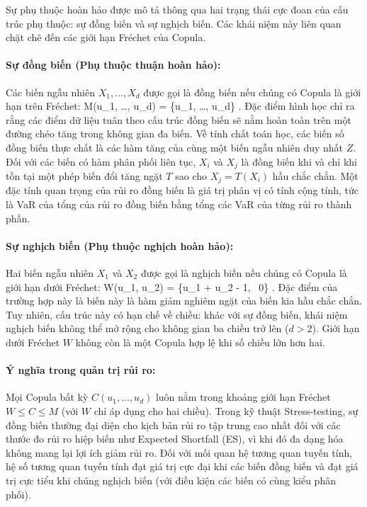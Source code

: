 Sự phụ thuộc hoàn hảo được mô tả thông qua hai trạng thái cực đoan của cấu trúc phụ thuộc: sự đồng biến và sự nghịch biến. Các khái niệm này liên quan chặt chẽ đến các giới hạn Fréchet của Copula.

\paragraph{Sự đồng biến (Phụ thuộc thuận hoàn hảo):}
Các biến ngẫu nhiên $X_1, \dots, X_d$ được gọi là đồng biến nếu chúng có Copula là giới hạn trên Fréchet:
\bea
M(u_1, \dots, u_d) = \min\{u_1, \dots, u_d\} .
\eea
Đặc điểm hình học chỉ ra rằng các điểm dữ liệu tuân theo cấu trúc đồng biến sẽ nằm hoàn toàn trên một đường chéo tăng trong không gian đa biến. Về tính chất toán học, các biến số đồng biến thực chất là các hàm tăng của cùng một biến ngẫu nhiên duy nhất $Z$. Đối với các biến có hàm phân phối liên tục, $X_i$ và $X_j$ là đồng biến khi và chỉ khi tồn tại một phép biến đổi tăng ngặt $T$ sao cho $X_j = T(X_i)$ hầu chắc chắn. Một đặc tính quan trọng của rủi ro đồng biến là giá trị phân vị có tính cộng tính, tức là VaR của tổng của rủi ro đồng biến bằng tổng các VaR của từng rủi ro thành phần.

\paragraph{Sự nghịch biến (Phụ thuộc nghịch hoàn hảo):}
Hai biến ngẫu nhiên $X_1$ và $X_2$ được gọi là nghịch biến nếu chúng có Copula là giới hạn dưới Fréchet:
\bea
W(u_1, u_2) = \max\{u_1 + u_2 - 1, \, 0\} .
\eea
Đặc điểm của trường hợp này là biến này là hàm giảm nghiêm ngặt của biến kia hầu chắc chắn. Tuy nhiên, cấu trúc này có hạn chế về chiều: khác với sự đồng biến, khái niệm nghịch biến không thể mở rộng cho không gian ba chiều trở lên ($d > 2$). Giới hạn dưới Fréchet $W$ không còn là một Copula hợp lệ khi số chiều lớn hơn hai.

\paragraph{Ý nghĩa trong quản trị rủi ro:}
Mọi Copula bất kỳ $C(u_1, \dots, u_d)$ luôn nằm trong khoảng giới hạn Fréchet $W \le C \le M$ (với $W$ chỉ áp dụng cho hai chiều). Trong kỹ thuật Stress-testing, sự đồng biến thường đại diện cho kịch bản rủi ro tập trung cao nhất đối với các thước đo rủi ro hiệp biến như Expected Shortfall (ES), vì khi đó đa dạng hóa không mang lại lợi ích giảm rủi ro. Đối với mối quan hệ tương quan tuyến tính, hệ số tương quan tuyến tính đạt giá trị cực đại khi các biến đồng biến và đạt giá trị cực tiểu khi chúng nghịch biến (với điều kiện các biến có cùng kiểu phân phối).
